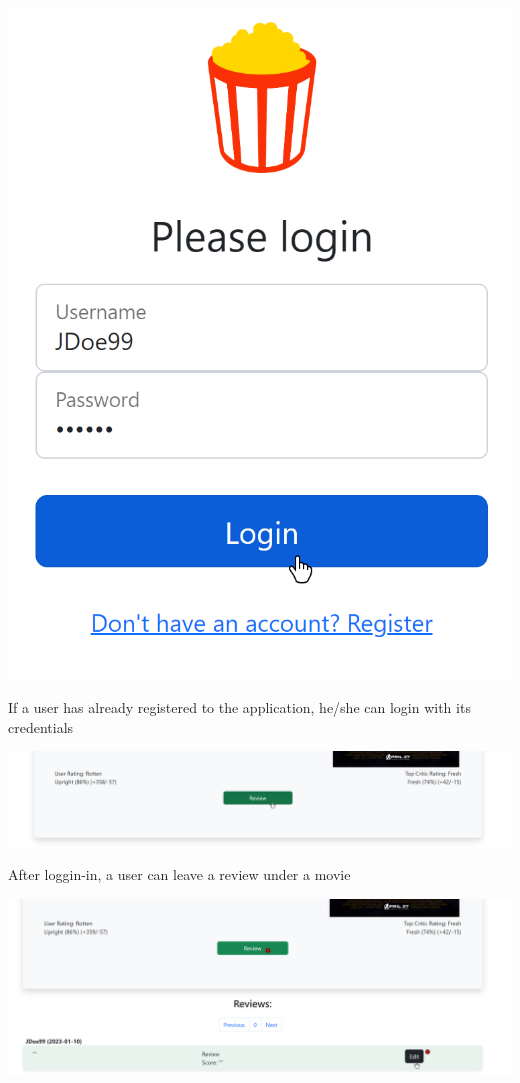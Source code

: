 \includegraphics[scale=0.45]{../../../images/user_manual/login.png} 

If a user has already registered to the application, he/she can login with its credentials

\includegraphics[scale=0.45]{../../../images/user_manual/review_button.png}
 
After loggin-in, a user can leave a review under a movie

\includegraphics[scale=0.45]{../../../images/user_manual/new_review.png} 

